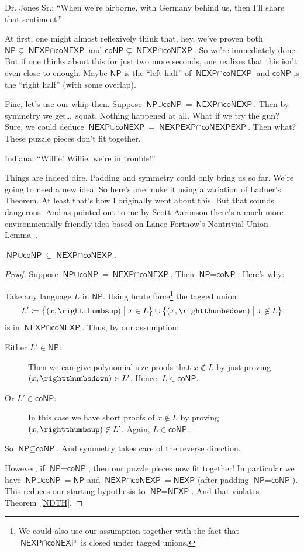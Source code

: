 \documentclass{article}
\theoremstyle{customstyle}
\newcommand{\NP}{\ensuremath{\textsf{NP}}}
\newcommand{\NEXP}{\ensuremath{\textsf{NEXP}}}
\newcommand{\coNP}{\ensuremath{\textsf{coNP}}}
\newcommand{\interEXP}{\ensuremath{\textsf{NEXP}\cap\textsf{coNEXP}}}
\newcommand{\interEXPEXP}{\ensuremath{\textsf{NEXPEXP}\cap\textsf{coNEXPEXP}}}
\newcommand{\unionP}{\ensuremath{\textsf{NP}\cup\textsf{coNP}}}
\newcommand{\unionEXP}{\ensuremath{\textsf{NEXP}\cup\textsf{coNEXP}}}
\newcommand{\tup}{\text{\rightthumbsup}}
\newcommand{\tdown}{\text{\rightthumbsdown}}
\begin{document}
Dr. Jones Sr.: ``When we're airborne, with Germany behind us, then I'll share that sentiment.''

At first, one might almost reflexively think that, hey, we've proven both $\NP \subsetneq \interEXP$ and $\coNP \subsetneq \interEXP$. So we're immediately done. But if one thinks about this for just two more seconds, one realizes that this isn't even close to enough. Maybe $\NP$ is the ``left half'' of $\interEXP$ and $\coNP$ is the ``right half'' (with some overlap).

Fine, let's use our whip then. Suppose $\unionP = \interEXP$. Then by symmetry we get\dots\ squat. Nothing happened at all. What if we try the gun? Sure, we could deduce $\unionEXP = \interEXPEXP$. Then what? These puzzle pieces don't fit together.

Indiana: ``Willie! Willie, we're in trouble!''

Things are indeed dire. Padding and symmetry could only bring us so far. We're going to need a new idea. So here's one: nuke it using a variation of Ladner's Theorem. At least that's how I originally went about this. But that sounds dangerous. And as pointed out to me by Scott Aaronson there's a much more environmentally friendly idea based on Lance Fortnow's Nontrivial Union Lemma~\cite{fortnow}.

\begin{theorem}
$\unionP \subsetneq \interEXP$.\label{X}
\end{theorem}

\begin{proof}
Suppose $\unionP = \interEXP$. Then $\NP = \coNP$. Here's why: 

Take any language $L$ in $\NP$. Using brute force\footnote{We could also use our assumption together with the fact that $\interEXP$ is closed under tagged unions.} the tagged union
\[
L' \coloneqq \bigl\{(x, \tup) \bigm| x \in L\bigr\} \cup \bigl\{(x, \tdown) \bigm| x \not \in L \bigr\}
\]
is in $\interEXP$. Thus, by our assumption:
\begin{description}
\item[Either $L' \in \NP$:] Then we can give polynomial size proofs that $x \not \in L$ by just proving $(x, \tdown) \in L'$. Hence, $L \in \coNP$.
\item[Or $L' \in \coNP$:] In this case we have short proofs of $x \not \in L$ by proving $(x, \tup) \not \in L'$. Again, $L \in \coNP$.
\end{description}
So $\NP \subseteq \coNP$. And symmetry takes care of the reverse direction.

However, if $\NP = \coNP$, then our puzzle pieces now fit together! In particular we have $\unionP = \NP$ and $\interEXP = \NEXP$ (after padding $\NP = \coNP$). This reduces our starting hypothesis to $\NP = \NEXP$. And that violates Theorem~\ref{NDTH}. \lightning
\end{proof}
\end{document}
